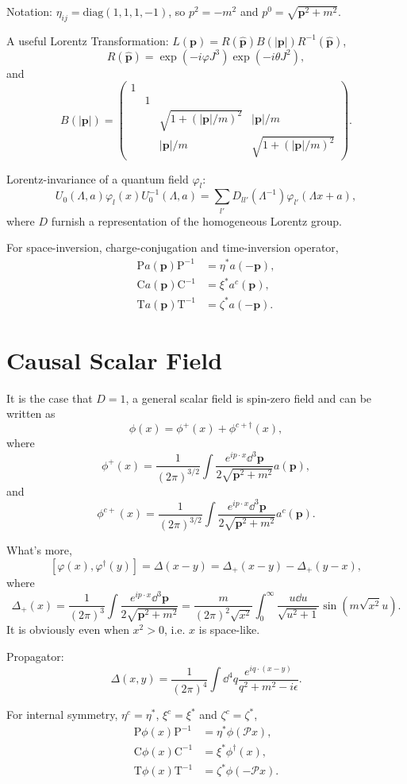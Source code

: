 \documentclass[9pt]{extbook}
\begin{document}
Notation: $\eta_{ij}=\mathrm{diag}(1,1,1,-1)$, so $p^2=-m^2$ and $p^0=\sqrt{\bm{p}^2+m^2}$.

A useful Lorentz Transformation: $L(\bm{p})=R(\hat{\bm{p}})B(|\bm{p}|)R^{-1}(\hat{\bm{p}})$, 
\[
	R(\hat{\bm{p}})=\exp(-i\varphi J^3)\exp(-i\theta J^2),
\]
and 
\[
	B(|\bm{p}|)=
	\begin{pmatrix}
		1&&&\\
		&1&&\\
		&&\sqrt{1+(|\bm{p}|/m)^2}&|\bm{p}|/m\\
		&&|\bm{p}|/m&\sqrt{1+(|\bm{p}|/m)^2}
	 \end{pmatrix}.
\]

Lorentz-invariance of a quantum field $\varphi_l$:
\[
	U_0(\Lambda,a)\varphi_l(x)U_0^{-1}(\Lambda,a)=\sum_{l'}D_{ll'}(\Lambda^{-1})\varphi_{l'}(\Lambda x+a),
\]
where $D$ furnish a representation of the homogeneous Lorentz group.

For space-inversion, charge-conjugation and time-inversion operator,
\begin{align*}
	\mathrm{P}a(\bm{p})\mathrm{P}^{-1}&=\eta^*a(-\bm{p}),\\
	\mathrm{C}a(\bm{p})\mathrm{C}^{-1}&=\xi^*a^c(\bm{p}),\\
	\mathrm{T}a(\bm{p})\mathrm{T}^{-1}&=\zeta^*a(-\bm{p}).
\end{align*}

\section{Causal Scalar Field}
It is the case that $D=1$, a general scalar field is spin-zero field and can be written as
\[
	\phi(x)=\phi^+(x)+\phi^{c+\dag}(x),
\]
where
\[
	\phi^+(x)=\frac{1}{(2\pi)^{3/2}}\int \frac{e^{ip\cdot x}\dd^3\bm{p}}{2\sqrt{\bm{p}^2+m^2}}a(\bm{p}),
\]
and
\[
	\phi^{c+}(x)=\frac{1}{(2\pi)^{3/2}}\int \frac{e^{ip\cdot x}\dd^3\bm{p}}{2\sqrt{\bm{p}^2+m^2}}a^c(\bm{p}).
\]

What's more,
\[
	[\varphi(x),\varphi^\dag(y)]=\Delta(x-y)=\Delta_+(x-y)-\Delta_+(y-x),
\]
where
\[
	\Delta_+(x)=\frac{1}{(2\pi)^3}\int  \frac{e^{ip\cdot x}\dd^3\bm{p}}{2\sqrt{\bm{p}^2+m^2}}=\frac{m}{(2\pi)^2\sqrt{x^2}}\int_0^\infty  \frac{u\dd u}{\sqrt{u^2+1}}\sin(m\sqrt{x^2}u).
\]
It is obviously even when $x^2>0$, i.e. $x$ is space-like.

Propagator:
\[
	\Delta(x,y)=\frac{1}{(2\pi)^4}\int \dd^4q \frac{e^{iq\cdot (x-y)}}{q^2+m^2-i\epsilon}.
\]

For internal symmetry, $\eta^c=\eta^*$, $\xi^c=\xi^*$ and $\zeta^c=\zeta^*$,
\[
\begin{split}
	\mathrm{P}\phi(x)\mathrm{P}^{-1}&=\eta^*\phi(\mathscr{P}x),\\
	\mathrm{C}\phi(x)\mathrm{C}^{-1}&=\xi^*\phi^{\dag}(x),\\
	\mathrm{T}\phi(x)\mathrm{T}^{-1}&=\zeta^*\phi(-\mathscr{P}x).
\end{split}
\]
\end{document}
